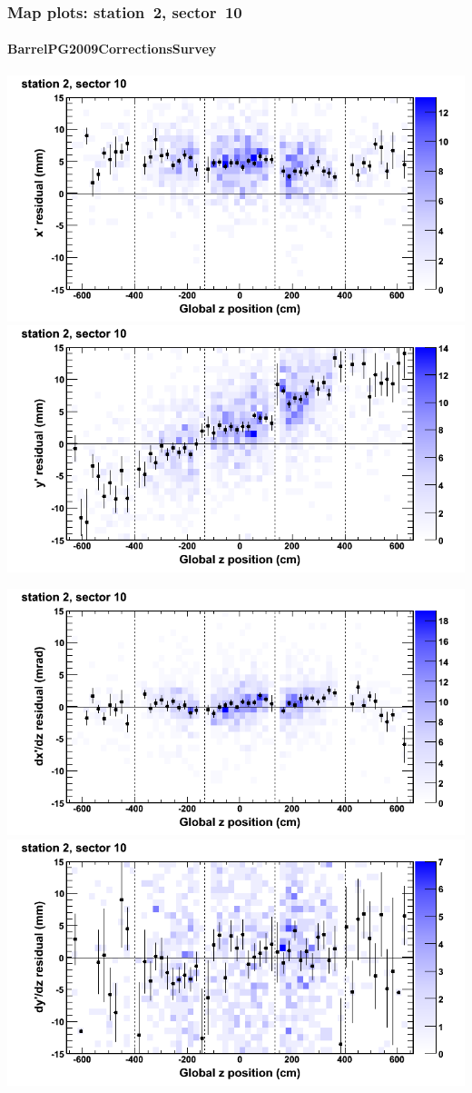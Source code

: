 \documentclass[compress]{beamer}
\begin{document}
\begin{frame}
\frametitle{Map plots: station~2, sector~10}
\framesubtitle{BarrelPG2009CorrectionsSurvey}
\includegraphics[width=0.5\linewidth]{mapplots_01/DTvsz_st2sec10_x.png}
\includegraphics[width=0.5\linewidth]{mapplots_01/DTvsz_st2sec10_y.png}

\includegraphics[width=0.5\linewidth]{mapplots_01/DTvsz_st2sec10_dxdz.png}
\includegraphics[width=0.5\linewidth]{mapplots_01/DTvsz_st2sec10_dydz.png}
\end{frame}
\end{document}
